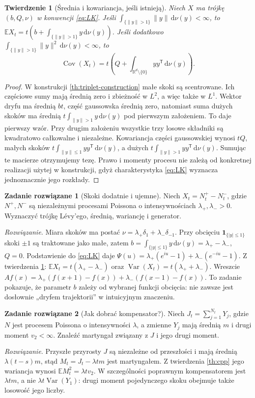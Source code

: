 \documentclass[11pt,a4paper,oneside]{report}
\numberwithin{equation}{chapter}
\theoremstyle{plain}
\newtheorem{twierdzenie}{Twierdzenie}[chapter]
\theoremstyle{definition}
\newtheorem{zadanie}{Zadanie rozwiązane}[chapter]
\theoremstyle{remark}
\newcommand{\R}{\mathbb{R}}
\newcommand{\E}{\mathbb{E}}
\newcommand{\Var}{\operatorname{Var}}
\newcommand{\ind}[1]{\mathbf{1}_{#1}}
\newcommand{\dd}{\mathrm{d}}
\begin{document}
\begin{twierdzenie}[Średnia i kowariancja, jeśli istnieją]
\label{th:levy-moments}
Niech $X$ ma trójkę $(b,Q,\nu)$ w konwencji
\eqref{eq:LK}. Jeśli
$\int_{\{\|y\|>1\}}\|y\|\,\dd\nu(y)<\infty$,
to $\E X_t=t(b+\int_{\{\|y\|>1\}}y\,\dd\nu(y))$.
Jeśli dodatkowo
$\int_{\{\|y\|>1\}}\|y\|^2\,\dd\nu(y)<\infty$,
to
\[
\operatorname{Cov}(X_t)
=t\left(Q+\int_{\R^d\setminus\{0\}}yy^{\mathsf T}\,\dd\nu(y)\right).
\]
\end{twierdzenie}
\begin{proof}
W konstrukcji \ref{th:triplet-construction} małe skoki są
scentrowane. Ich częściowe sumy mają średnią zero i
zbieżność w $L^2$, a więc także w $L^1$.
Wektor dryfu ma średnią $bt$, część gaussowska średnią
zero, natomiast suma dużych skoków ma średnią
$t\int_{\|y\|>1}y\,\dd\nu(y)$ pod pierwszym
założeniem. To daje pierwszy wzór.
Przy drugim założeniu wszystkie trzy losowe składniki
są kwadratowo całkowalne i niezależne. Kowariancja
części gaussowskiej wynosi $tQ$, małych skoków
$t\int_{\|y\|\le1}yy^{\mathsf T}\,\dd\nu(y)$,
a dużych $t\int_{\|y\|>1}yy^{\mathsf T}\,\dd\nu(y)$.
Sumując te macierze otrzymujemy tezę.
Prawo i momenty procesu nie zależą od konkretnej
realizacji użytej w konstrukcji, gdyż charakterystyka
\eqref{eq:LK} wyznacza jednoznacznie jego rozkłady.
\end{proof}

\begin{zadanie}[Skoki dodatnie i ujemne]
Niech $X_t=N_t^+-N_t^-$, gdzie $N^+,N^-$ są niezależnymi
procesami Poissona o intensywnościach $\lambda_+,\lambda_->0$.
Wyznaczyć trójkę Lévy'ego, średnią, wariancję i generator.

\emph{Rozwiązanie.} Miara skoków ma postać
$\nu=\lambda_+\delta_1+\lambda_-\delta_{-1}$.
Przy obcięciu $\ind{\{|y|\le1\}}$ skoki $\pm1$
są traktowane jako małe, zatem
$b=\int_{\{|y|\le1\}}y\,\dd\nu(y)=\lambda_+-\lambda_-$,
$Q=0$. Podstawienie do \eqref{eq:LK} daje
$\Psi(u)=\lambda_+(e^{iu}-1)+\lambda_-(e^{-iu}-1)$.
Z twierdzenia \ref{th:levy-moments}:
$\E X_t=t(\lambda_+-\lambda_-)$ oraz
$\Var(X_t)=t(\lambda_++\lambda_-)$. Wreszcie
$Af(x)=\lambda_+(f(x+1)-f(x))+
\lambda_-(f(x-1)-f(x))$.
To zadanie pokazuje, że parametr $b$ zależy od wybranej
funkcji obcięcia: nie zawsze jest dosłownie „dryfem
trajektorii” w intuicyjnym znaczeniu.
\end{zadanie}

\begin{zadanie}[Jak dobrać kompensator?]
Niech $J_t=\sum_{j=1}^{N_t}Y_j$, gdzie
$N$ jest procesem Poissona o intensywności $\lambda$,
a zmienne $Y_j$ mają średnią $m$ i drugi moment $v_2<\infty$.
Znaleźć martyngał związany z $J$ i jego drugi moment.

\emph{Rozwiązanie.} Przyszłe przyrosty $J$ są
niezależne od przeszłości i mają średnią
$\lambda(t-s)m$, stąd
$M_t=J_t-\lambda tm$ jest martyngałem.
Z twierdzenia \ref{th:cpp} jego wariancja wynosi
$\E M_t^2=\lambda tv_2$.
W szczególności poprawnym kompensatorem jest
$\lambda tm$, a nie $\lambda t\Var(Y_1)$:
drugi moment pojedynczego skoku obejmuje także losowość
jego liczby.
\end{zadanie}
\end{document}

